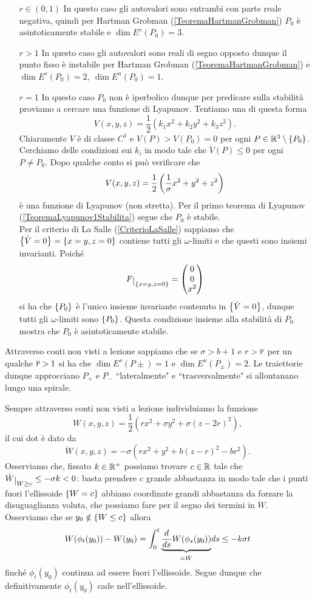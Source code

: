 \begin{itemize}
\item[$\boxed{r\in(0,1)}$] In questo caso gli autovalori sono entrambi con parte reale negativa, quindi per Hartman Grobman (\ref{TeoremaHartmanGrobman}) $P_0$ \`e asintoticamente stabile e $\dim E^s(P_0)=3$.
\item[$\boxed{r>1}$] In questo caso gli autovalori sono reali di segno opposto dunque il punto fisso \`e instabile per Hartman Grobman (\ref{TeoremaHartmanGrobman}) e $\dim E^s(P_0)=2,\ \dim E^u(P_0)=1$.
\item[$\boxed{r=1}$] In questo caso $P_0$ non \`e iperbolico dunque per predicare sulla stabilit\`a proviamo a cercare una funzione di Lyapunov. Tentiamo una di questa forma
\[V(x,y,z)=\frac12(k_1x^2+k_2y^2+k_3z^2).\]
Chiaramente $V$ \`e di classe $C^1$ e $V(P)>V(P_0)=0$ per ogni $P\in\mathbb{R}^3\setminus\left\{{P_0}\right\}$. Cerchiamo delle condizioni sui $k_i$ in modo tale che $\dot V(P)\leq 0$ per ogni $P\neq P_0$. Dopo qualche conto si pu\`o verificare che
\[V(x,y,z)=\frac12\left({\frac1\sigma x^2+y^2+z^2}\right)\]
\`e una funzione di Lyapunov (non stretta). Per il primo teorema di Lyapunov (\ref{TeoremaLyapunov1Stabilita}) segue che $P_0$ \`e stabile.\\
Per il criterio di La Salle (\ref{CriterioLaSalle}) sappiamo che $\left\{{\dot V=0}\right\}=\left\{{x=y,z=0}\right\}$ contiene tutti gli $\omega$-limiti e che questi sono insiemi invarianti. Poich\'e
\[F\res{\cpa{x=y,z=0}}=\mat{0\\0\\x^2}\]
si ha che $\left\{{P_0}\right\}$ \`e l'unico insieme invariante contenuto in $\left\{{\dot V=0}\right\}$, dunque tutti gli $\omega$-limiti sono $\left\{{P_0}\right\}$. Questa condizione insieme alla stabilit\`a di $P_0$ mostra che $P_0$ \`e asintoticamente stabile.
\end{itemize}
\setlength{\leftmargini}{0.5cm}
Attraverso conti non visti a lezione sappiamo che se $\sigma>b+1$ e $r>\overline{r}$ per un qualche $\overline{r}>1$ si ha che $\dim E^s(P\pm)=1$ e $\dim E^u(P_\pm)=2$. Le traiettorie dunque approcciano $P_+$ e $P_-$ ``lateralmente" e ``trasversalmente" si allontanano lungo una spirale.

Sempre attraverso conti non visti a lezione individuiamo la funzione
\[W(x,y,z)=\frac12(rx^2+\sigma y^2+\sigma(z-2r)^2),\]
il cui dot \`e dato da
\[\dot W(x,y,z)=-\sigma(rx^2+y^2+b(z-r)^2-br^2).\]
Osserviamo che, fissato $k\in\mathbb{R}^+$ possiamo trovare $c\in\mathbb{R}$ tale che $\dot W\res{W\geq c}\leq -\sigma k<0$: basta prendere $c$ grande abbastanza in modo tale che i punti fuori l'ellissoide $\left\{{W=c}\right\}$ abbiano coordinate grandi abbastanza da forzare la disuguaglianza voluta, che possiamo fare per il segno dei termini in $\dot W$.\\
Osserviamo che se $y_0\notin \left\{{W\leq c}\right\}$ allora
\[W(\phi_t(y_0))-W(y_0)=\int_0^t\under{=\dot W}{\dd s{}W(\phi_s(y_0))}ds\leq -k\sigma t\]
finch\'e $\phi_t(y_0)$ continua ad essere fuori l'ellissoide. Segue dunque che definitivamente $\phi_t(y_0)$ cade nell'ellissoide.

